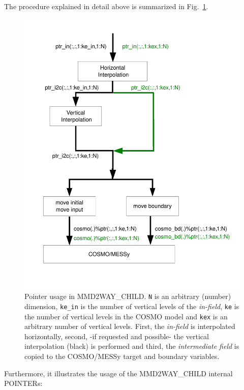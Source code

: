 \documentclass[11pt,twoside]{article}
\begin{document}
The procedure explained in detail above is summarized in Fig.~\ref{fig:pointer}.
\begin{figure}
\begin{center} 
\includegraphics[width=0.99\columnwidth]{MMDUM_ptr.pdf} 
\end{center} 
\vspace*{-.5cm}
\caption{Pointer usage in MMD2WAY\_CHILD. {\tt N} is an arbitrary (number) dimension, 
{\tt ke\_in}
is the number of vertical levels of the {\it in-field}, {\tt ke} is the
number of vertical levels in the COSMO model and {\tt kex} is an arbitrary number
of vertical levels. First, the {\it in-field} is interpolated horizontally,
second, -if requested and possible- the vertical interpolation (black) is 
performed  and third, the {\it intermediate field} is copied to the COSMO/MESSy
target and boundary variables.}
\label{fig:pointer} 
\end{figure} 
Furthermore, it illustrates the usage of the MMD2WAY\_CHILD internal {\footnotesize POINTER}s:
\end{document}
